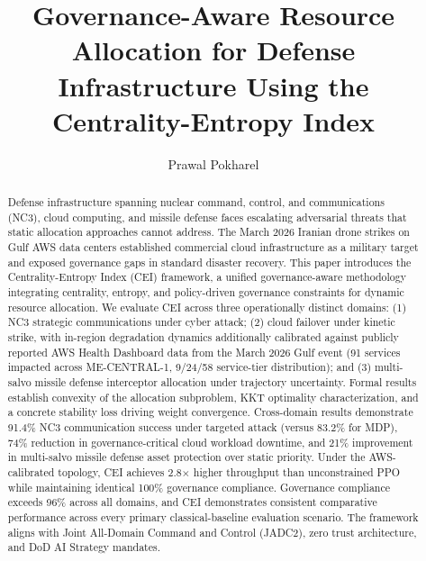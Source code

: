 \documentclass[runningheads]{llncs}
\begin{document}
\title{Governance-Aware Resource Allocation for Defense Infrastructure Using the Centrality-Entropy Index}


\author{Prawal Pokharel\orcidID{}}


\maketitle

\begin{abstract}
Defense infrastructure spanning nuclear command, control, and communications (NC3), cloud computing, and missile defense faces escalating adversarial threats that static allocation approaches cannot address. The March 2026 Iranian drone strikes on Gulf AWS data centers established commercial cloud infrastructure as a military target and exposed governance gaps in standard disaster recovery. This paper introduces the Centrality-Entropy Index (CEI) framework, a unified governance-aware methodology integrating centrality, entropy, and policy-driven governance constraints for dynamic resource allocation. We evaluate CEI across three operationally distinct domains: (1) NC3 strategic communications under cyber attack; (2) cloud failover under kinetic strike, with in-region degradation dynamics additionally calibrated against publicly reported AWS Health Dashboard data from the March 2026 Gulf event (91 services impacted across ME-CENTRAL-1, 9/24/58 service-tier distribution); and (3) multi-salvo missile defense interceptor allocation under trajectory uncertainty. Formal results establish convexity of the allocation subproblem, KKT optimality characterization, and a concrete stability loss driving weight convergence. Cross-domain results demonstrate 91.4\% NC3 communication success under targeted attack (versus 83.2\% for MDP), 74\% reduction in governance-critical cloud workload downtime, and 21\% improvement in multi-salvo missile defense asset protection over static priority. Under the AWS-calibrated topology, CEI achieves 2.8$\times$ higher throughput than unconstrained PPO while maintaining identical 100\% governance compliance. Governance compliance exceeds 96\% across all domains, and CEI demonstrates consistent comparative performance across every primary classical-baseline evaluation scenario. The framework aligns with Joint All-Domain Command and Control (JADC2), zero trust architecture, and DoD AI Strategy mandates.

\end{abstract}
\end{document}
